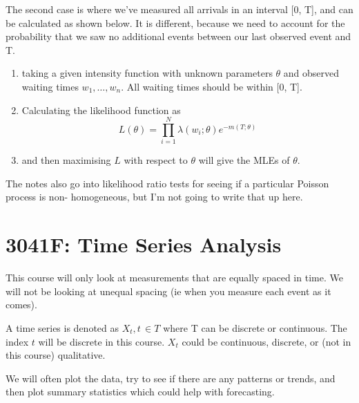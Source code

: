\documentclass[12pt]{article}
\begin{document}
    The second case is where we've measured all arrivals in an interval [0, T], and can be 
    calculated as shown below. It is different, because we need to account for the probability that 
    we saw no additional events between our last observed event and T.
    \begin{enumerate}
        \item taking a given intensity function with unknown parameters \(\theta\) and observed waiting times \(w_1, \dots, w_n\). All waiting times should be within [0, T].
        \item Calculating the likelihood function as 
            \begin{equation*}
                L(\theta) = \prod_{i=1}^{N}\lambda(w_i; \theta) e^{-m(T; \theta)}
            \end{equation*}
        \item and then maximising \(L\) with respect to \(\theta\) will give the MLEs of \(\theta\).
    \end{enumerate}

    The notes also go into likelihood ratio tests for seeing if a particular Poisson process is non-
    homogeneous, but I'm not going to write that up here.

    \section{3041F: Time Series Analysis}
    This course will only look at measurements that are equally spaced in time. We will not be looking at unequal spacing (ie when you measure each event as it comes).

    A time series is denoted as \(X_t, t \, \in T\) where T can be discrete or continuous.\newline
    The index \(t\) will be discrete in this course.
    \(X_t\) could be continuous, discrete, or (not in this course) qualitative. \newline \newline

    We will often plot the data, try to see if there are any patterns or trends, and then plot summary statistics which could help with forecasting.
\end{document}
